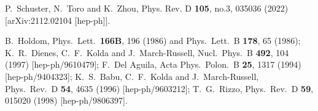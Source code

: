 \documentclass[14pt]{article}
\begin{document}
{\begin{thebibliography}{99}
P.~Schuster, N.~Toro and K.~Zhou,
Phys. Rev. D \textbf{105}, no.3, 035036 (2022)
[arXiv:2112.02104 [hep-ph]].


  B.~Holdom,
  Phys.\ Lett.\  {\bf 166B}, 196 (1986) and
  Phys.\ Lett.\ B {\bf 178}, 65 (1986); 
  K.~R.~Dienes, C.~F.~Kolda and J.~March-Russell,
  Nucl.\ Phys.\ B {\bf 492}, 104 (1997)
  [hep-ph/9610479];
  F.~Del Aguila,
  Acta Phys.\ Polon.\ B {\bf 25}, 1317 (1994)
  [hep-ph/9404323];
  K.~S.~Babu, C.~F.~Kolda and J.~March-Russell,
  Phys.\ Rev.\ D {\bf 54}, 4635 (1996)
  [hep-ph/9603212];
  T.~G.~Rizzo,
  Phys.\ Rev.\ D {\bf 59}, 015020 (1998)
  [hep-ph/9806397].


\end{thebibliography}}
\end{document}

